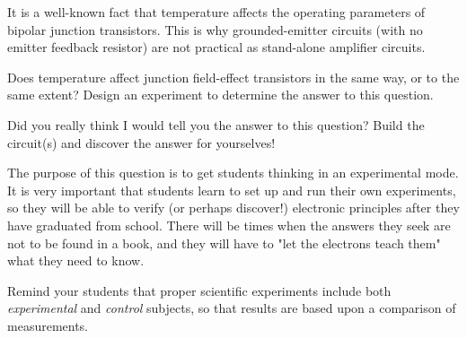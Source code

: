 

It is a well-known fact that temperature affects the operating parameters of bipolar junction transistors.  This is why grounded-emitter circuits (with no emitter feedback resistor) are not practical as stand-alone amplifier circuits.

Does temperature affect junction field-effect transistors in the same way, or to the same extent?  Design an experiment to determine the answer to this question.







Did you really think I would tell you the answer to this question?  Build the circuit(s) and discover the answer for yourselves!







The purpose of this question is to get students thinking in an experimental mode.  It is very important that students learn to set up and run their own experiments, so they will be able to verify (or perhaps discover!) electronic principles after they have graduated from school.  There will be times when the answers they seek are not to be found in a book, and they will have to "let the electrons teach them" what they need to know.

Remind your students that proper scientific experiments include both {\it experimental} and {\it control} subjects, so that results are based upon a comparison of measurements.




